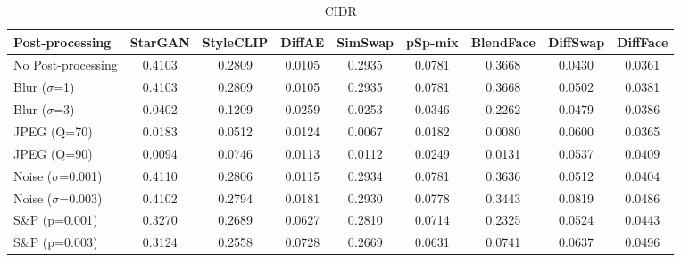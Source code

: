 \documentclass{article}
\begin{document}
\begin{table}[h!]
\begin{subtable}{\textwidth}
\caption{CIDR}
\centering
\scriptsize
\begin{tabular}{lcccccccc}
\toprule
\textbf{Post-processing} & StarGAN & StyleCLIP & DiffAE & SimSwap & pSp-mix & BlendFace & DiffSwap & DiffFace \\
\midrule
No Post-processing & 0.4103 & 0.2809 & 0.0105 & 0.2935 & 0.0781 & 0.3668 & 0.0430 & 0.0361 \\
\midrule
Blur ($\sigma$=1) & 0.4103 & 0.2809 & 0.0105 & 0.2935 & 0.0781 & 0.3668 & 0.0502 & 0.0381 \\
Blur ($\sigma$=3) & 0.0402 & 0.1209 & 0.0259 & 0.0253 & 0.0346 & 0.2262 & 0.0479 & 0.0386 \\
JPEG (Q=70) & 0.0183 & 0.0512 & 0.0124 & 0.0067 & 0.0182 & 0.0080 & 0.0600 & 0.0365 \\
JPEG (Q=90) & 0.0094 & 0.0746 & 0.0113 & 0.0112 & 0.0249 & 0.0131 & 0.0537 & 0.0409 \\
Noise ($\sigma$=0.001) & 0.4110 & 0.2806 & 0.0115 & 0.2934 & 0.0781 & 0.3636 & 0.0512 & 0.0404 \\
Noise ($\sigma$=0.003) & 0.4102 & 0.2794 & 0.0181 & 0.2930 & 0.0778 & 0.3443 & 0.0819 & 0.0486 \\
S\&P (p=0.001) & 0.3270 & 0.2689 & 0.0627 & 0.2810 & 0.0714 & 0.2325 & 0.0524 & 0.0443 \\
S\&P (p=0.003) & 0.3124 & 0.2558 & 0.0728 & 0.2669 & 0.0631 & 0.0741 & 0.0637 & 0.0496 \\
\bottomrule
\end{tabular}
\end{subtable}


\end{table}
\end{document}
